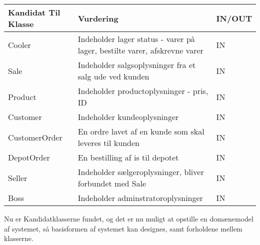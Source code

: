 \begin{longtable}{|p{120pt}|p{120pt}|p{120pt}|}\label{fig:Kandidatklasser}
    \hline
    \textbf{Kandidat Til Klasse} & \textbf{Vurdering} & \textbf{IN/OUT} \\
    \hline
    \hline
    Cooler & Indeholder lager status - varer på lager, bestilte varer, afskrevne varer & IN \\
    \hline
    Sale & Indeholder salgsoplysninger fra et salg ude ved kunden & IN \\
    \hline
    Product & Indeholder productoplysninger - pris, ID & IN \\
    \hline
    Customer & Indeholder kundeoplysninger & IN \\
    \hline
    CustomerOrder & En ordre lavet af en kunde som skal leveres til kunden & IN \\
    \hline
    DepotOrder & En bestilling af is til depotet & IN \\
    \hline
    Seller & Indeholder sælgeroplysninger, bliver forbundet med Sale & IN \\
    \hline
    Boss & Indeholder adminstratoroplysninger & IN \\
    \hline
\end{longtable}
Nu er Kandidatklasserne fundet, og det er nu muligt at opstille en domænemodel af systemet, så basisformen af systemet kan designes, samt forholdene mellem klasserne.
